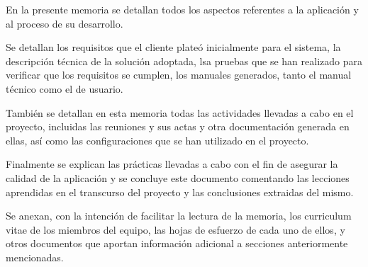 En la presente memoria se detallan todos los aspectos referentes a la aplicación y al proceso de su desarrollo.

Se detallan los requisitos que el cliente plateó inicialmente para el sistema, la descripción técnica de la solución adoptada, lsa pruebas que se han realizado para verificar que los requisitos se cumplen, los manuales generados, tanto el manual técnico como el de usuario.

También se detallan en esta memoria todas las actividades llevadas a cabo en el proyecto, incluidas las reuniones y sus actas y otra documentación generada en ellas, así como las configuraciones que se han utilizado en el proyecto.

Finalmente se explican las prácticas llevadas a cabo con el fin de asegurar la calidad de la aplicación y se concluye este documento comentando las lecciones aprendidas en el transcurso del proyecto y las conclusiones extraidas del mismo.

Se anexan, con la intención de facilitar la lectura de la memoria, los curriculum vitae de los miembros del equipo, las hojas de esfuerzo de cada uno de ellos, y otros documentos que aportan información adicional a secciones anteriormente mencionadas.